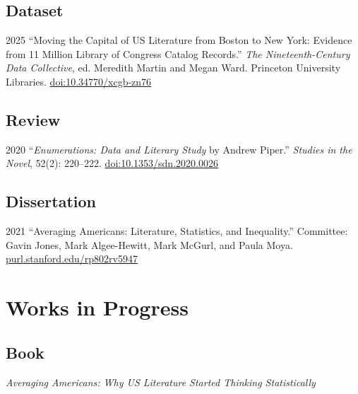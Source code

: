 \documentclass[12pt,letterpaper]{report}
\begin{document}
\subsection*{Dataset}

\begin{tablist}
	\item[2025] \tab{}\enquote{Moving the Capital of US Literature from Boston to New York: Evidence from 11 Million Library of Congress Catalog Records.} \emph{The Nineteenth-Century Data Collective}, ed. Meredith Martin and Megan Ward. Princeton University Libraries. \href{https://doi.org/10.34770/xcgb-zn76}{doi:10.34770/xcgb-zn76}
\end{tablist}

\subsection*{Review}

\begin{tablist}
	\item[2020] \tab{}\enquote{\emph{Enumerations: Data and Literary Study} by Andrew Piper.} \textit{Studies in the Novel}, 52(2): 220--222. \href{https://doi.org/10.1353/sdn.2020.0026}{doi:10.1353/sdn.2020.0026}
\end{tablist}

\subsection*{Dissertation}

\begin{tablist}
	\item[2021] \tab{}\enquote{Averaging Americans: Literature, Statistics, and Inequality.}
	Committee: Gavin Jones, Mark Algee-Hewitt, Mark McGurl, and Paula Moya.
	\href{https://purl.stanford.edu/rp802rv5947}{purl.stanford.edu/rp802rv5947}
\end{tablist}

\section*{Works in Progress}

\subsection*{Book}

\textit{Averaging Americans: Why US Literature Started Thinking Statistically}
\end{document}
